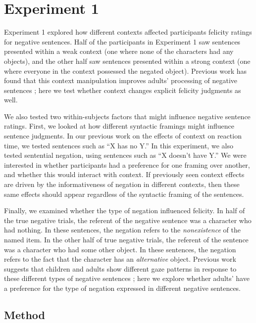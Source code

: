 \documentclass[10pt,letterpaper]{article}
\begin{document}
\section{Experiment 1}

Experiment 1 explored how different contexts affected participants felicity ratings for negative sentences.  Half of the participants in Experiment 1 saw sentences presented within a weak context (one where none of the characters had any objects), and the other half saw sentences presented within a strong context (one where everyone in the context possessed the negated object).  Previous work has found that this context manipulation improves adults' processing of negative sentences \cite{nordmeyer2014}; here we test whether context changes explicit felicity judgments as well.  

We also tested two within-subjects factors that might influence negative sentence ratings.  First, we looked at how different syntactic framings might influence sentence judgments.  In our previous work on the effects of context on reaction time, we tested sentences such as ``X has no Y.''  In this experiment, we also tested sentential negation, using sentences such as ``X doesn't have Y.''  We were interested in whether participants had a preference for one framing over another, and whether this would interact with context.  If previously seen context effects are driven by the informativeness of negation in different contexts, then these same effects should appear regardless of the syntactic framing of the sentences.  

Finally, we examined whether the type of negation influenced felicity.  In half of the true negative trials, the referent of the negative sentence was a character who had nothing.  In these sentences, the negation refers to the \emph{nonexistence} of the named item.  In the other half of true negative trials, the referent of the sentence was a character who had some other object.  In these sentences, the negation refers to the fact that the character has an \emph{alternative} object.  Previous work suggests that children and adults show different gaze patterns in response to these different types of negative sentences \cite{nordmeyer2014b}; here we explore whether adults' have a preference for the type of negation expressed in different negative sentences.

\subsection{Method}
\end{document}
